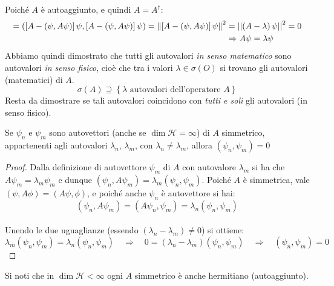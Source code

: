 Poiché $A$ è autoaggiunto, e quindi $A=A^\dag$:
\begin{align}
\nonumber =\left(\left[A-\left(\psi,A\psi\right)\right]\psi,\left[A-\left(\psi,A\psi\right)\right]\psi\right)=\left\lVert\left[A-\left(\psi,A\psi\right)\right]\psi\right\rVert^2&=\left|\left|\left(A-\lambda\right)\psi\right|\right|^2 = 0\\
\label{eqn:fluttuazione-autoaggiunto}
 &\Rightarrow A\psi=\lambda\psi
\end{align}
Abbiamo quindi dimostrato che tutti gli autovalori \textit{in senso matematico} sono autovalori \textit{in senso fisico}, cioè che tra i valori $\lambda \in \sigma \left(O\right)$ si trovano gli autovalori (matematici) di $A$.
\[
\sigma\left(A\right)\supseteq\left\{\lambda\text{ autovalori dell'operatore } A\right\}
\]
Resta da dimostrare se tali autovalori  coincidono con \textit{tutti e soli} gli autovalori (in senso fisico).\\

\begin{thm}
Se $\psi_n$ e $\psi_m$ sono autovettori (anche se $\dim{\mathcal{H}=\infty}$) di $A$ simmetrico, appartenenti agli autovalori $\lambda_n$, $\lambda_m$, con $\lambda_n\neq \lambda_m$, allora $\left(\psi_n, \psi_m\right)=0$
\end{thm}
\begin{proof} Dalla definizione di autovettore $\psi_m$ di $A$ con autovalore $\lambda_m$ si ha che $A\psi_m = \lambda_m \psi_m$ e dunque $\left(\psi_n, A\psi_m\right)=\lambda_m\left(\psi_n, \psi_m\right)$.
Poiché $A$ è simmetrica, vale $(\psi, A \phi) = (A \psi, \phi)$, e poiché anche $\psi_n$ è autovettore si hai:
\[ (\psi_n, A\psi_m) = (A\psi_n, \psi_m) = \lambda_n (\psi_n, \psi_m)\]\\
Unendo le due uguaglianze (essendo $\left(\lambda_n-\lambda_m\right)\neq 0$) si ottiene:
\[
\lambda_m (\psi_n, \psi_m) = \lambda_n (\psi_n, \psi_m) \quad \Rightarrow \quad 0 = (\lambda_n -\lambda_m)(\psi_n, \psi_m) \quad \Rightarrow \quad (\psi_n, \psi_m) = 0
\]
\end{proof}
Si noti che in $\dim{\mathcal{H}<\infty}$ ogni $A$ simmetrico è anche hermitiano (autoaggiunto).\\ %

